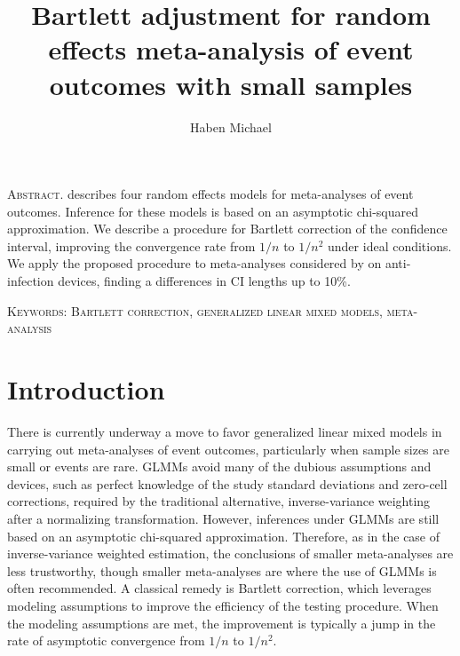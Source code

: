 \documentclass[12pt]{article}
\title{Bartlett adjustment for random effects meta-analysis of event outcomes with small samples}
\author[1]{Haben Michael}
\affil[1]{University of Massachusetts, Amherst, MA (hmichael@math.umass.edu)}
\date{}
\newcommand{\n}{n}
\begin{document}
\maketitle

\textsc{Abstract.} \citet{stijnen:10} describes four random effects models for
meta-analyses of event outcomes. Inference for these models is based
on an asymptotic chi-squared approximation. We describe a procedure
for Bartlett correction of the confidence interval, improving the
convergence rate from $1/\n$ to $1/\n^2$ under ideal conditions. We
apply the proposed procedure to meta-analyses considered by \citet{stijnen:10} on anti-infection devices, finding a differences in CI lengths
up to 10\%.

\textsc{Keywords: Bartlett correction,
  generalized linear mixed models, meta-analysis}


\section{Introduction}
\label{sec:introduction}

There is currently underway a move to favor generalized linear mixed
models in carrying out meta-analyses of event outcomes, particularly
when sample sizes are small or events are rare. GLMMs avoid many of
the dubious assumptions and devices, such as perfect knowledge of the
study standard deviations and zero-cell corrections, required by the
traditional alternative, inverse-variance weighting after a normalizing transformation. %
However, inferences under GLMMs are still based on an asymptotic
chi-squared approximation. Therefore, as in the case of
inverse-variance weighted estimation, the conclusions of smaller
meta-analyses are less trustworthy, though smaller  meta-analyses are where the use
of GLMMs is often recommended. A classical remedy is Bartlett
correction, which leverages modeling assumptions to improve the
efficiency of the testing procedure. When the modeling assumptions
are met, the improvement is typically a jump in the rate of asymptotic
convergence from $1/\n$ to $1/\n^2$. 
\end{document}
